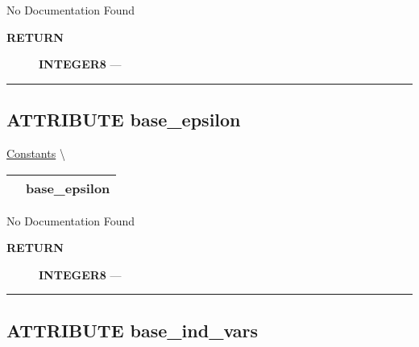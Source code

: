 \par





No Documentation Found








\par
\begin{description}
\item [\colorbox{tagtype}{\color{white} \textbf{\textsf{RETURN}}}] \textbf{INTEGER8} --- 
\end{description}




\rule{\linewidth}{0.5pt}
\subsection*{\textsf{\colorbox{headtoc}{\color{white} ATTRIBUTE}
base\_epsilon}}

\hypertarget{ecldoc:logisticregression.constants.base_epsilon}{}
\hspace{0pt} \hyperlink{ecldoc:LogisticRegression.Constants}{Constants} \textbackslash 

{\renewcommand{\arraystretch}{1.5}
\begin{tabularx}{\textwidth}{|>{\raggedright\arraybackslash}l|X|}
\hline
\hspace{0pt}\mytexttt{\color{red} } & \textbf{base\_epsilon} \\
\hline
\end{tabularx}
}

\par





No Documentation Found








\par
\begin{description}
\item [\colorbox{tagtype}{\color{white} \textbf{\textsf{RETURN}}}] \textbf{INTEGER8} --- 
\end{description}




\rule{\linewidth}{0.5pt}
\subsection*{\textsf{\colorbox{headtoc}{\color{white} ATTRIBUTE}
base\_ind\_vars}}


